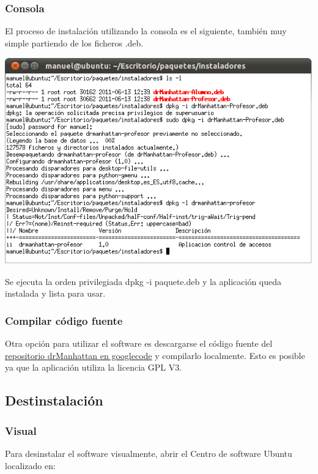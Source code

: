 \documentclass[a4paper,11pt]{article}
\begin{document}
\subsubsection{Consola}

El proceso de instalación utilizando la consola es el siguiente, también muy simple partiendo de los ficheros .deb.


\begin{center}

    \includegraphics[width=.90\linewidth]{imagenes/instalacionConsola}

\end{center}

Se ejecuta la orden privilegiada dpkg -i paquete.deb y la aplicación queda instalada y lista para usar.

\subsubsection{Compilar código fuente}

Otra opción para utilizar el software es descargarse el código fuente del \href{http://code.google.com/p/drmanhattan/}{repositorio drManhattan en googlecode} y compilarlo localmente. Esto es posible ya que la aplicación utiliza la licencia GPL V3.

\subsection{Destinstalación}

\subsubsection{Visual}

Para desinstalar el software visualmente, abrir el Centro de software Ubuntu localizado en:
\end{document}
